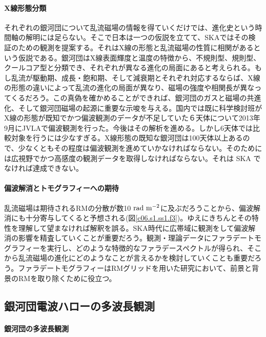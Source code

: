 \paragraph{X線形態分類}

それぞれの銀河団について乱流磁場の情報を得ていくだけでは、進化史という時間軸の解明には足らない。そこで日本は一つの仮説を立てて、SKAではその検証のための観測を提案する。それはX線の形態と乱流磁場の性質に相関があるという仮説である。銀河団はX線表面輝度と温度の特徴から、不規則型、規則型、クールコア型と分類でき、それぞれが異なる進化の局面にあると考えられる。もし乱流が駆動期、成長・飽和期、そして減衰期とそれぞれ対応するならば、X線の形態の違いによって乱流の進化の局面が異なり、磁場の強度や相関長が異なってくるだろう。この真偽を確かめることができれば、銀河団のガスと磁場の共進化、そして銀河団磁場の起源に重要な示唆を与える。国内では既に科学検討班がX線の形態が既知でかつ偏波観測のデータが不足していた６天体について2013年9月にJVLAで偏波観測を行った。今後はその解析を進める。しかし6天体では比較対象を行うには少なすぎる。X線形態の既知な銀河団は100天体以上あるので、少なくともその程度は偏波観測を進めていかなければならない。そのためには広視野でかつ高感度の観測データを取得しなければならない。それは SKA でなければ達成できない。

\paragraph{偏波解消とトモグラフィーへの期待}

乱流磁場は期待されるRMの分散が数10 ${\rm rad~m^{-2}}$に及ぶだろうことから、偏波解消にも十分寄与してくると予想される(図\ref{c06.s1.ss1.f3})。ゆえにきちんとその特性を理解して望まなければ解釈を誤る。SKA時代に広帯域に観測をして偏波解消の影響を精査していくことが重要だろう。観測・理論データにファラデートモグラフィーを実行し、どのような特徴的なファラデースペクトルが得られ、そこから乱流磁場の進化にどのようなことが言えるかを検討していくことも重要だろう。ファラデートモグラフィーはRMグリッドを用いた研究において、前景と背景のRMを取り除くために役立つ。


\subsection{銀河団電波ハローの多波長観測}
\label{c06.s3.ss7}

\paragraph{銀河団の多波長観測}

